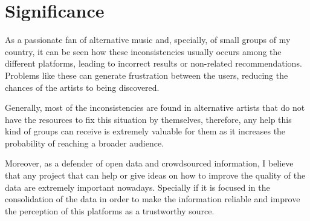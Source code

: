 \section{Significance}
As a passionate fan of alternative music and, specially, of small groups of my country, it can be seen how these inconsistencies usually occurs among the different platforms, leading to incorrect results or non-related recommendations.
Problems like these can generate frustration between the users, reducing the chances of the artists to being discovered. 

Generally, most of the inconsistencies are found in alternative artists that do not have the resources to fix this situation by themselves, therefore, any help this kind of groups can receive is extremely valuable for them as it increases the probability of reaching a broader audience.  

Moreover, as a defender of open data and crowdsourced information, I believe that any project that can help or give ideas on how to improve the quality of the data are extremely important nowadays. 
Specially if it is focused in the consolidation of the data in order to make the information reliable and improve the perception of this platforms as a trustworthy source. 